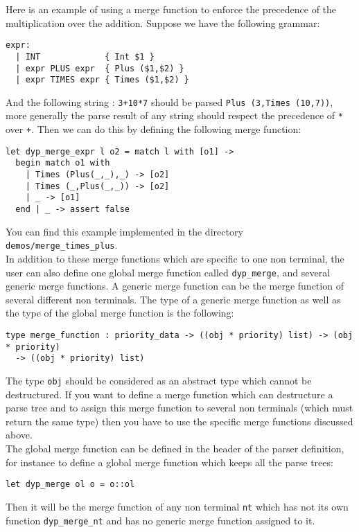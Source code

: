 \documentclass[12pt]{article}
\begin{document}
{Here is an example of using a merge function to enforce the precedence of the multiplication over the addition. Suppose we have the following grammar:
\begin{verbatim}
expr:
  | INT             { Int $1 }
  | expr PLUS expr  { Plus ($1,$2) }
  | expr TIMES expr { Times ($1,$2) }
\end{verbatim}
And the following string : \texttt{3+10*7} should be parsed \texttt{Plus (3,Times (10,7))}, more generally the parse result of any string should respect the precedence of \texttt{*} over \texttt{+}. Then we can do this by defining the following merge function:
\begin{verbatim}
let dyp_merge_expr l o2 = match l with [o1] ->
  begin match o1 with
    | Times (Plus(_,_),_) -> [o2]
    | Times (_,Plus(_,_)) -> [o2]
    | _ -> [o1]
  end | _ -> assert false
\end{verbatim}
You can find this example implemented in the directory \texttt{demos/merge\_times\_plus}.\\

In addition to these merge functions which are specific to one non terminal, the user can also define one global merge function called \verb|dyp_merge|, and several generic merge functions. A generic merge function can be the merge function of several different non terminals. The type of a generic merge function as well as the type of the global merge function is the following:
\begin{verbatim}
type merge_function : priority_data -> ((obj * priority) list) -> (obj * priority)
  -> ((obj * priority) list)
\end{verbatim}
The type \texttt{obj} should be considered as an abstract type which cannot be destructured. If you want to define a merge function which can destructure a parse tree and to assign this merge function to several non terminals (which must return the same type) then you have to use the specific merge functions discussed above.\\

The global merge function can be defined in the header of the parser definition, for instance to define a global merge function which keeps all the parse trees:
\begin{verbatim}
let dyp_merge ol o = o::ol
\end{verbatim}
Then it will be the merge function of any non terminal \texttt{nt} which has not its own function \verb|dyp_merge_nt| and has no generic merge function assigned to it.\\

}
\end{document}
